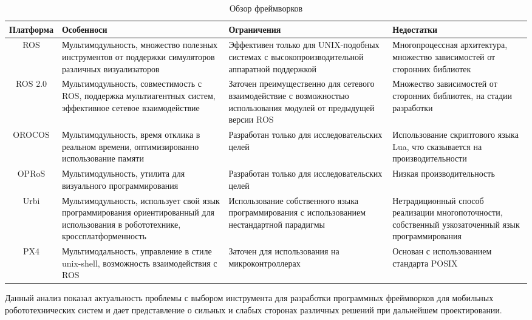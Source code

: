 \begin{table}
    \caption{\label{tab:frameworks}Обзор фреймворков}
    \begin{center}
        \begin{tabularx}{\textwidth}{|c|X|X|X|}
            \hline
            Платформа & Особенноси & Ограничения & Недостатки \\
            \hline
            ROS & Мультимодульность, множество полезных инструментов от поддержки симуляторов различных визуализаторов & Эффективен только для UNIX-подобных системах с высокопроизводительной аппаратной поддержкой & Многопроцессная архитектура, множество зависимостей от сторонних библиотек \\
            \hline
            ROS 2.0 & Мультимодульность, совместимость с ROS, поддержка мультиагентных систем, эффективное сетевое взаимодействие & Заточен преимущественно для сетевого взаимодействие с возможностью использования модулей от предыдущей версии ROS & Множество зависимостей от сторонних библиотек, на стадии разработки \\
            \hline
            OROCOS & Мультимодульность, время отклика в реальном времени, оптимизированно использование памяти & Разработан только для исследовательских целей & Использование скриптового языка Lua, что сказывается на производительности \\
            \hline
            OPRoS & Мультимодульность, утилита для визуального программирования & Разработан только для исследовательских целей & Низкая производительность \\
            \hline
            Urbi & Мультимодульность, использует свой язык программирования ориентированный для использования в робототехнике, кроссплатформенность & Использование собственного языка программирования с использованием нестандартной парадигмы & Нетрадиционный способ реализации многопоточности, собственный узкозаточенный язык программирования \\
            \hline
            PX4 & Мультимодальность, управление в стиле unix-shell, возможность взаимодействия с ROS & Заточен для использования на микроконтроллерах & Основан с использованием стандарта POSIX \\
            \hline
        \end{tabularx}
    \end{center}
\end{table}

Данный анализ показал актуальность проблемы с выбором инструмента для разработки программных фреймворков для мобильных робототехнических систем и дает представление о сильных и слабых сторонах различных решений при дальнейшем проектировании. 